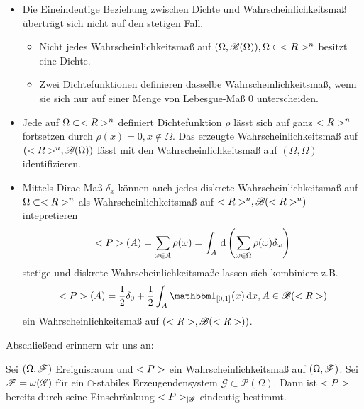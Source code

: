 \begin{*remark}
	\begin{itemize}
		\item Die Eineindeutige Beziehung zwischen Dichte und Wahrscheinlichkeitsmaß überträgt sich nicht auf den stetigen Fall.
		\begin{itemize}
			\item Nicht jedes Wahrscheinlichkeitsmaß auf $(\Omega, \mathscr{B}(\Omega)), \Omega \subset <R>^n$ besitzt eine Dichte.
			\item Zwei Dichtefunktionen definieren dasselbe Wahrscheinlichkeitsmaß, wenn sie sich nur auf einer Menge von Lebesgue-Maß $0$ unterscheiden.
		\end{itemize}
		\item Jede auf $\Omega \subset <R>^n$ definiert Dichtefunktion $\rho$ lässt sich auf ganz $<R>^n$ fortsetzen durch $\rho(x) = 0, x \not\in \Omega$. Das erzeugte Wahrscheinlichkeitsmaß auf $(<R>^n, \mathscr{B}(\Omega))$ lässt mit den Wahrscheinlichkeitsmaß auf $(\Omega, \mathscr{\Omega})$ identifizieren.
		\item Mittels Dirac-Maß $\delta_{x}$ können auch jedes diskrete Wahrscheinlichkeitsmaß auf $\Omega \subset <R>^n$ als Wahrscheinlichkeitsmaß auf $<R>^n, \mathscr{B}(<R>^n)$ intepretieren
		\begin{align}
			<P>(A) = \sum_{\omega \in A} \rho(\omega) = \int_{A} \,\mathrm{d} \left( \sum_{\omega \in \Omega} \rho(\omega)\delta_{\omega} \right)\notag
		\end{align}
		stetige und diskrete Wahrscheinlichkeitsmaße lassen sich kombiniere z.B.
		\begin{align}
			\probp(A) = \frac{1}{2} \delta_{0} + \frac{1}{2} \int_{A}\indi_{[0,1]}(x)\diff x, A \in \mathscr{B}(\R)\notag
		\end{align}
		ein Wahrscheinlichkeitsmaß auf $(<R>, \mathscr{B}(<R>))$.
	\end{itemize}
\end{*remark}

Abschließend erinnern wir uns an:

\begin{proposition}
	Sei $(\Omega, \mathscr{F})$ Ereignisraum und $<P>$ ein Wahrscheinlichkeitsmaß auf $(\Omega, \mathscr{F})$. 
	Sei $\mathscr{F} = \omega(\mathscr{G})$ für ein $\cap$-stabiles Erzeugendensystem $\mathscr{G} \subset \mathscr{P}(\Omega)$. 
	Dann ist $<P>$ bereits durch seine Einschränkung $<P>_{\mid \mathscr{G}}$ eindeutig bestimmt.
\end{proposition}

